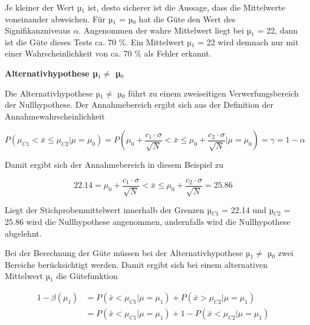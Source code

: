 \noindent Je kleiner der Wert µ$_{1}$ ist, desto sicherer ist die Aussage, dass die Mittelwerte voneinander abweichen. F\"{u}r µ$_{1}$ = µ$_{0}$ hat die G\"{u}te den Wert des Signifikanzniveaus $\alpha$. Angenommen der wahre Mittelwert liegt bei µ$_{1}$ = 22, dann ist die G\"{u}te dieses Tests ca. 70 \%. Ein Mittelwert µ$_{1}$ = 22 wird demnach nur mit einer Wahrscheinlichkeit von ca. 70 \% als Fehler erkannt.

\clearpage

{\selectfont
\noindent\textbf{Alternativhypothese µ$_{1} \neq$ µ$_{0}$}}\smallskip

\noindent Die Alternativhypothese µ$_{1} \neq$ µ$_{0}$ f\"{u}hrt zu einem zweiseitigen Verwerfungsbereich der Nullhypothese. Der Annahmebereich ergibt sich aus der Definition der Annahmewahrscheinlichkeit

\begin{equation}\label{eq:sixseventyone}
P\left(\mu _{C1} <\bar{x}\le \mu _{C2} |\mu =\mu _{0} \right)=P\left(\mu _{0} +\dfrac{c_{1} \cdot \sigma }{\sqrt{N} } <\bar{x}\le \mu _{0} +\dfrac{c_{2} \cdot \sigma }{\sqrt{N} } |\mu =\mu _{0} \right)=\gamma =1-\alpha
\end{equation}

\noindent Damit ergibt sich der Annahmebereich in diesem Beispiel zu

\begin{equation}\label{eq:sixseventytwo}
22.14=\mu _{0} +\dfrac{c_{1} \cdot \sigma}{\sqrt{N}} <\bar{x}\le \mu _{0} +\dfrac{c_{2} \cdot \sigma}{\sqrt{N}} =25.86
\end{equation}

\noindent Liegt der Stichprobenmittelwert innerhalb der Grenzen µ$_{C1}$ = 22.14 und µ$_{C2}$ = 25.86 wird die Nullhypothese angenommen, andernfalls wird die Nullhypothese abgelehnt.\noindent

\noindent Bei der Berechnung der G\"{u}te m\"{u}ssen bei der Alternativhypothese µ$_{1} \neq$ µ$_{0}$ zwei Bereiche ber\"{u}cksichtigt werden. Damit ergibt sich bei einem alternativen Mittelwert µ$_{1}$ die G\"{u}tefunktion

\begin{equation}\label{eq:sixseventythree}
\begin{split}
1-\beta \left(\mu _{1} \right) & = P\left(\bar{x}<\mu _{C1} |\mu =\mu _{1} \right)+P\left(\bar{x}>\mu _{C2} |\mu =\mu _{1} \right) \\ 
& = P\left(\bar{x}<\mu _{C1} |\mu =\mu _{1} \right)+1-P\left(\bar{x}<\mu _{C2} |\mu =\mu _{1} \right)    
\end{split}
\end{equation}

